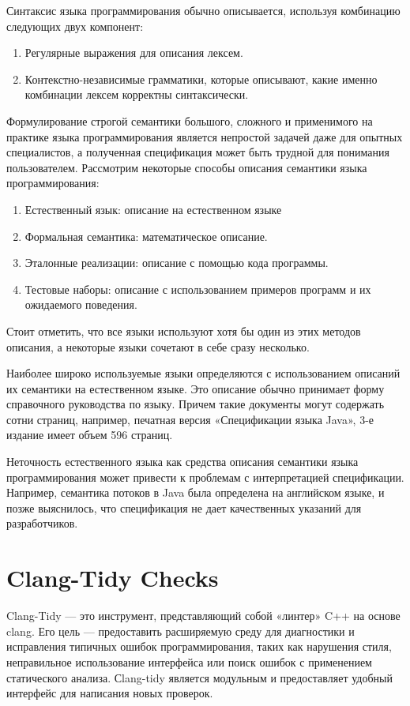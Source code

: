 \documentclass{mipt-thesis-bs}
\begin{document}
Синтаксис языка программирования обычно описывается, используя комбинацию следующих двух компонент:
\begin{enumerate}
    \item Регулярные выражения для описания лексем.
    \item Контекстно-независимые грамматики, которые описывают, какие именно комбинации лексем
    корректны синтаксически.
\end{enumerate}

Формулирование строгой семантики большого, сложного и применимого на практике языка 
программирования является непростой задачей даже для опытных специалистов, 
а полученная спецификация может быть трудной для понимания пользователем.
Рассмотрим некоторые способы описания семантики языка 
программирования:
\begin{enumerate}
    \item Естественный язык: описание на естественном языке
    \item Формальная семантика: математическое описание.
    \item Эталонные реализации: описание с помощью кода программы.
    \item Тестовые наборы: описание с использованием примеров программ
    и их ожидаемого поведения.
\end{enumerate}

Стоит отметить, что все языки используют хотя бы один из этих методов 
описания, а некоторые языки сочетают в себе сразу несколько.

Наиболее широко используемые языки определяются с использованием описаний 
их семантики на естественном языке. Это описание обычно принимает форму 
справочного руководства по языку. Причем такие документы могут содержать сотни 
страниц, например, печатная версия «Спецификации языка Java», 3-е издание имеет объем 596 страниц.

Неточность естественного языка как средства описания семантики 
языка программирования может привести к проблемам с интерпретацией 
спецификации. Например, семантика потоков в Java была определена на 
английском языке, и позже выяснилось, что спецификация не дает 
качественных указаний для разработчиков.

\section{Clang-Tidy Checks}

Clang-Tidy — это инструмент, представляющий собой «линтер» C++ на основе clang.
Его цель — предоставить расширяемую среду для диагностики и 
исправления типичных ошибок 
программирования, таких как нарушения стиля, неправильное использование 
интерфейса или поиск ошибок с применением статического 
анализа. Сlang-tidy является модульным и предоставляет удобный 
интерфейс для написания новых проверок.
\end{document}
